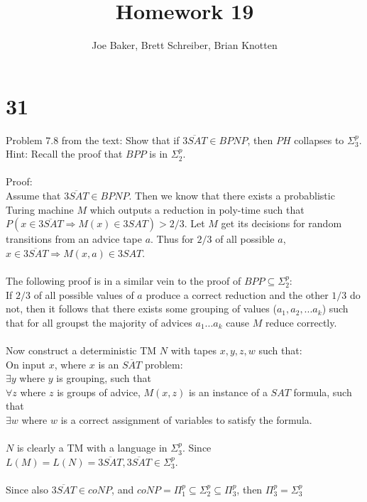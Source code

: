 \documentclass[letterpaper,notitlepage,twoside]{article}
\renewcommand{\implies}{\Rightarrow} %
\begin{document}
\title{Homework 19}
\author{Joe Baker, Brett Schreiber, Brian Knotten}
\maketitle

\section*{31}
Problem 7.8 from the text: Show that if $\overline{3SAT} \in BPNP$, then $PH$ collapses to $\Sigma_3^p$.
\\
Hint: Recall the proof that $BPP$ is in $\Sigma_2^p$.
\\\\
Proof:
\\
Assume that $\overline{3SAT} \in BPNP$. Then we know that there exists a probablistic Turing machine $M$ which outputs a reduction in poly-time such that $P(x \in \overline{3SAT} \implies M(x) \in 3SAT) > 2/3$. Let $M$ get its decisions for random transitions from an advice tape $a$. Thus for $2/3$ of all possible $a$, $x \in \overline{3SAT} \implies M(x, a) \in 3SAT$.
\\\\
The following proof is in a similar vein to the proof of $BPP \subseteq \Sigma_2^p$:\\
If $2/3$ of all possible values of $a$ produce a correct reduction and the other $1/3$ do not, then it follows that there exists some grouping of values ($a_1, a_2, ... a_k$) such that for all groupst the majority of advices $a_1...a_k$ cause $M$ reduce correctly.
\\\\
Now construct a deterministic TM $N$ with tapes $x, y, z, w$ such that:\\
On input $x$, where $x$ is an $\overline{SAT}$ problem: \\
$\exists y$ where $y$ is grouping, such that \\
$\forall z$ where $z$ is groups of advice, $M(x, z)$ is an instance of a $SAT$ formula, such that \\
$\exists w$ where $w$ is a correct assignment of variables to satisfy the formula.
\\\\
$N$ is clearly a TM with a language in $\Sigma_3^p$. Since $L(M) = L(N) = \overline{3SAT}, \overline{3SAT} \in \Sigma_3^p$.
\\\\
Since also $\overline{3SAT} \in coNP$, and $coNP = \Pi_1^p \subseteq \Sigma_2^p \subseteq \Pi_3^p$, then $\Pi_3^p = \Sigma_3^p$
\end{document}
